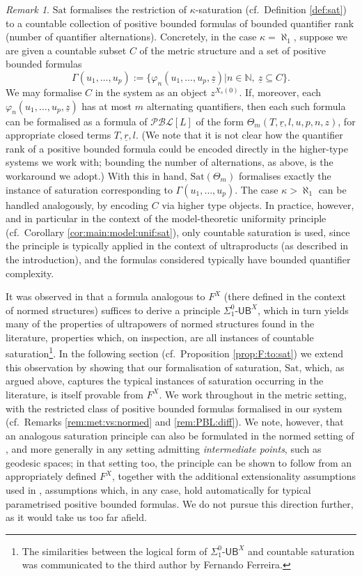 \documentclass[11pt]{amsart}
\theoremstyle{definition}
\theoremstyle{remark}
\newtheorem{remark}[theorem]{Remark}
\def\NN{\mathbb{N}}
\def\sigUB{\Sigma^0_1\mbox{-}\mathsf{UB}^{X}}
\begin{document}
\begin{remark}
\label{rem:F:t:sat}
$\mathrm{Sat}$ formalises the restriction of $\kappa$-saturation (cf.\ Definition \ref{def:sat}) to a countable collection of positive bounded formulas of bounded quantifier rank (number of quantifier alternations). Concretely, in the case $\kappa = \aleph_1$, suppose we are given a countable subset $C$ of the metric structure and a set of positive bounded formulas
\[
\Gamma(u_1,\ldots,u_p) := \{\varphi_n(u_1,\ldots,u_p,\underline{z}) | n \in \NN,\ \underline{z} \subseteq C\}.
\]
We may formalise $C$ in the system as an object $z^{X_s(0)}$. If, moreover, each $\varphi_n(u_1,\ldots,u_p,\underline z)$ has at most $m$ alternating quantifiers, then each such formula can be formalised as a formula of $\mathcal{PBL}[L]$ of the form $\Theta_m(T,\underline r, l, u, p, n, z)$, for appropriate closed terms $T,\underline r, l$. (We note that it is not clear how the quantifier rank of a positive bounded formula could be encoded directly in the higher-type systems we work with; bounding the number of alternations, as above, is the workaround we adopt.) With this in hand, $\mathrm{Sat}(\Theta_m)$ formalises exactly the instance of saturation corresponding to $\Gamma(u_1,\ldots,u_p)$. The case $\kappa > \aleph_1$ can be handled analogously, by encoding $C$ via higher type objects. In practice, however, and in particular in the context of the model-theoretic uniformity principle (cf.\ Corollary \ref{cor:main:model:unif:sat}), only countable saturation is used, since the principle is typically applied in the context of ultraproducts (as described in the introduction), and the formulas considered typically have bounded quantifier complexity.

It was observed in \cite{GuK2016} that a formula analogous to $F^X$ (there defined in the context of normed structures) suffices to derive a principle $\sigUB$, which in turn yields many of the properties of ultrapowers of normed structures found in the literature, properties which, on inspection, are all instances of countable saturation\footnote{The similarities between the logical form of $\sigUB$ and countable saturation was communicated to the third author by Fernando Ferreira.}. In the following section (cf.\ Proposition \ref{prop:F:to:sat}) we extend this observation by showing that our formalisation of saturation, $\mathrm{Sat}$, which, as argued above, captures the typical instances of saturation occurring in the literature, is itself provable from $F^X$. We work throughout in the metric setting, with the restricted class of positive bounded formulas formalised in our system (cf.\ Remarks \ref{rem:met:vs:normed} and \ref{rem:PBL:diff}). We note, however, that an analogous saturation principle can also be formulated in the normed setting of \cite{GuK2016}, and more generally in any setting admitting \emph{intermediate points}, such as geodesic spaces; in that setting too, the principle can be shown to follow from an appropriately defined $F^X$, together with the additional extensionality assumptions used in \cite{GuK2016}, assumptions which, in any case, hold automatically for typical parametrised positive bounded formulas. We do not pursue this direction further, as it would take us too far afield.
\end{remark}
\end{document}
